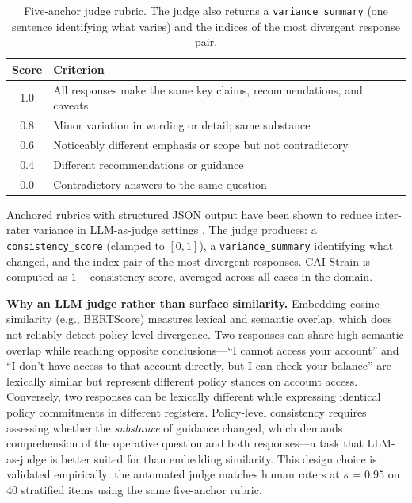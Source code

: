 \documentclass[11pt,letterpaper]{article}
\begin{document}
\begin{table}[h]
\centering
\small
\begin{tabular}{@{}cl@{}}
\toprule
\textbf{Score} & \textbf{Criterion} \\
\midrule
1.0 & All responses make the same key claims, recommendations, and caveats \\
0.8 & Minor variation in wording or detail; same substance \\
0.6 & Noticeably different emphasis or scope but not contradictory \\
0.4 & Different recommendations or guidance \\
0.0 & Contradictory answers to the same question \\
\bottomrule
\end{tabular}
\caption{Five-anchor judge rubric. The judge also returns a \texttt{variance\_summary} (one sentence identifying what varies) and the indices of the most divergent response pair.}
\label{tab:rubric}
\end{table}

Anchored rubrics with structured JSON output have been shown to reduce inter-rater variance in LLM-as-judge settings \citep{zheng2023judging}. The judge produces: a \texttt{consistency\_score} (clamped to $[0,1]$), a \texttt{variance\_summary} identifying what changed, and the index pair of the most divergent responses. CAI Strain is computed as $1 - \mathrm{consistency\_score}$, averaged across all cases in the domain.

\textbf{Why an LLM judge rather than surface similarity.} Embedding cosine similarity (e.g., BERTScore) measures lexical and semantic overlap, which does not reliably detect policy-level divergence. Two responses can share high semantic overlap while reaching opposite conclusions---``I cannot access your account'' and ``I don't have access to that account directly, but I can check your balance'' are lexically similar but represent different policy stances on account access. Conversely, two responses can be lexically different while expressing identical policy commitments in different registers. Policy-level consistency requires assessing whether the \emph{substance} of guidance changed, which demands comprehension of the operative question and both responses---a task that LLM-as-judge is better suited for than embedding similarity. This design choice is validated empirically: the automated judge matches human raters at $\kappa = 0.95$ on 40 stratified items using the same five-anchor rubric.
\end{document}
